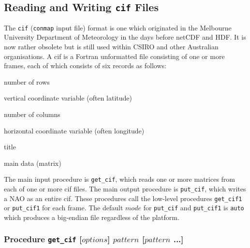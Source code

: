 \subsection{Reading and Writing \texttt{cif} Files}
    \label{bin-io-cif}

The 
  \texttt{cif} (\texttt{conmap} input file) format is one which originated in the
  Melbourne University Department of Meteorology in the days before
  netCDF and HDF. It is now rather obsolete but is still used within
  CSIRO and other Australian organisations. A cif is a Fortran
  unformatted file consisting of one or more frames, each of which
  consists of six records as follows:
\begin{bullets}
    \item number of rows
    \item vertical coordinate variable (often latitude)
    \item number of columns
    \item horizontal coordinate variable (often longitude)
    \item title
    \item main data (matrix)
\end{bullets}

The main input procedure is 
  \texttt{get\_cif}, which reads one or more matrices from each of
  one or more cif files. The main output procedure is 
  \texttt{put\_cif}, which writes a NAO as an entire cif. These
  procedures call the low-level procedures 
  \texttt{get\_cif1} or 
  \texttt{put\_cif1} for each frame. The default 
  $\mathit{mode}$ for 
  \texttt{put\_cif} and 
  \texttt{put\_cif1} is 
  \texttt{auto} which produces a big-endian file regardless of the
  platform.

\subsubsection{Procedure
\texttt{get\_cif} [$\mathit{options}$] $\mathit{pattern}$ [$\mathit{pattern}$ ...]}
    \label{bin-io-get-cif}

